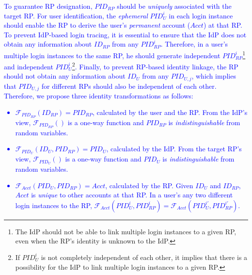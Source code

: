 \textcolor{blue}{To guarantee RP designation, $PID_{RP}$ should be \emph{uniquely} associated with the target RP.
For user identification, the \emph{ephemeral} $PID_{U}^i$ in each login instance should enable the RP to derive the user's \emph{permanent} account  ($Acct$) at that RP. 
To prevent IdP-based login tracing, it is essential to ensure that the IdP does not obtain any information about $ID_{RP}$ from any $PID_{RP}^i$. Therefore, in a user's multiple login instances to the same RP, he should generate independent $PID_{RP}^i$\footnote{The IdP should not be able to link multiple login instances to a given RP, even when the RP's identity is unknown to the IdP.} %
and independent $PID_U^i$\footnote{If $PID_U^i$ is not completely independent of each other, it implies that there is a possibility for the IdP to link multiple login instances to a given RP.}.
Finally, to prevent RP-based identity linkage,
the RP should not obtain any information about $ID_U$ from any $PID_{U,j}$, which implies that $PID_{U,j}$ for different RPs should also be independent of each other. 
Therefore, we propose three identity transformations as follows:
\vspace{-\topsep}\begin{itemize}
\setlength{\topsep}{0pt}
\setlength{\partopsep}{0pt}
\setlength{\itemsep}{0pt}
\setlength{\parsep}{0pt}
\setlength{\parskip}{0pt}
\item
$\mathcal{F}_{PID_{RP}}(ID_{RP}) = PID_{RP}$, calculated by the user and the RP.
From the IdP's view,
$\mathcal{F}_{PID_{RP}}()$ is a one-way function and $PID_{RP}$
is \emph{indistinguishable} from random variables.
\item
$\mathcal{F}_{PID_U}(ID_U, PID_{RP}) = PID_{U}$, calculated by the IdP.
From the target RP's view,
    $\mathcal{F}_{PID_U}()$ is a one-way function and $PID_{U}$ is \emph{indistinguishable} from random variables.
\item
$\mathcal{F}_{Acct}(PID_{U}, PID_{RP}) = Acct$, calculated by the RP.
Given $ID_U$ and $ID_{RP}$, $Acct$ is %
\emph{unique} to other accounts at that RP. 
In a user's any two different login instances to the RP,
 $\mathcal{F}_{Acct}(PID_{U}^i, PID_{RP}^i) = \mathcal{F}_{Acct}(PID_{U}^{i'}, PID_{RP}^{i'})$.
\end{itemize}}

